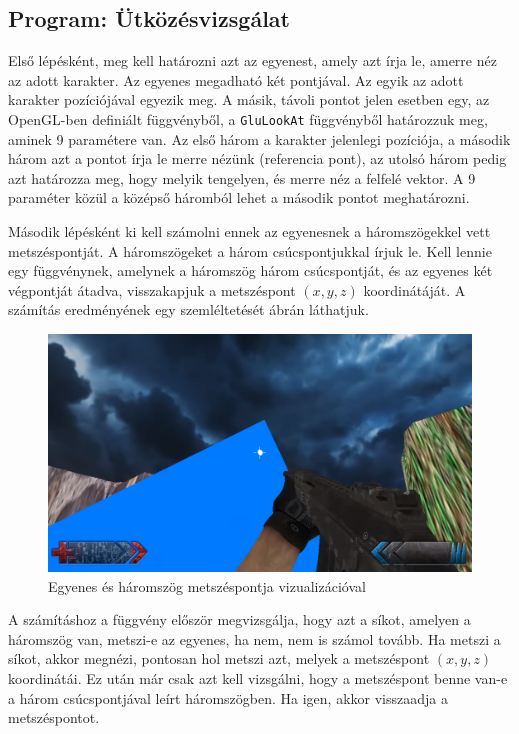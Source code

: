 \subsection{Program: Ütközésvizsgálat}

Első lépésként, meg kell határozni azt az egyenest, amely azt írja le, amerre néz az adott karakter. Az egyenes megadható két pontjával. Az egyik az adott karakter pozíciójával egyezik meg. A másik, távoli pontot jelen esetben egy, az OpenGL-ben definiált függvényből, a \texttt{GluLookAt} függvényből határozzuk meg, aminek 9 paramétere van. Az első három a karakter jelenlegi pozíciója, a második három azt a pontot írja le merre nézünk (referencia pont), az utolsó három pedig azt határozza meg, hogy melyik tengelyen, és merre néz a felfelé vektor. A 9 paraméter közül a középső háromból lehet a második pontot  meghatározni.

Második lépésként ki kell számolni ennek az egyenesnek a háromszögekkel vett metszéspontját. A háromszögeket a három csúcspontjukkal írjuk le. Kell lennie egy függvénynek, amelynek a háromszög három csúcspontját, és az egyenes két végpontját átadva, visszakapjuk a metszéspont $(x, y, z)$ koordinátáját. A számítás eredményének egy szemléltetését  ábrán láthatjuk.

\begin{figure}[h]
\centering
\includegraphics[scale=0.46]{kepek/one_triangle.png}
\caption{Egyenes és háromszög metszéspontja vizualizációval}
\label{fig:triangle}
\end{figure}

A számításhoz a függvény először megvizsgálja, hogy azt a síkot, amelyen a háromszög van, metszi-e az egyenes, ha nem, nem is számol tovább. Ha metszi a síkot, akkor megnézi, pontosan hol metszi azt, melyek a metszéspont $(x, y, z)$ koordinátái. Ez után már csak azt kell vizsgálni, hogy a metszéspont benne van-e a három csúcspontjával leírt háromszögben. Ha igen, akkor visszaadja a metszéspontot.

